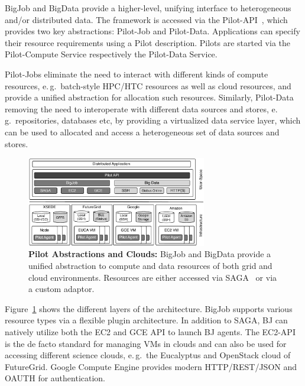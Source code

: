 \documentclass[times]{cpeauth}
\newcommand{\pilot}{Pilot\xspace}
\newcommand{\pilots}{Pilots\xspace}
\newcommand{\pilotjob}{Pilot-Job\xspace}
\newcommand{\pilotjobs}{Pilot-Jobs\xspace}
\newcommand{\pilotdata}{Pilot-Data\xspace}
\newcommand{\pilotdataservice}{Pilot-Data Service\xspace}
\newcommand{\pilotcomputeservice}{Pilot-Compute Service\xspace}
\begin{document}
BigJob and BigData provide a higher-level, unifying interface to heterogeneous
and/or distributed data. The framework is accessed via the
Pilot-API~\cite{pilot_api}, which provides two key abstractions: \pilotjob and
\pilotdata. Applications can specify their resource requirements using a
\pilot description. \pilots are started via the \pilotcomputeservice
respectively the \pilotdataservice.

\pilotjobs eliminate the need to interact with different kinds of compute 
resources, e.\,g.\ batch-style HPC/HTC resources as well as cloud resources, 
and provide a unified abstraction for allocation such resources. Similarly, 
\pilotdata removing the need to interoperate with different data sources and 
stores, e.\,g.\ repositories, databases etc, by providing a virtualized data 
service layer, which can be used to allocated and access a heterogeneous set 
of data sources and stores.

\begin{figure}[t]
	\centering
		\includegraphics[width=0.7\textwidth]{figures/cloud_pilot_job.pdf}
	\caption{\textbf{Pilot Abstractions and Clouds:} BigJob and BigData 
	provide a unified abstraction to compute and data resources of both grid 
	and cloud environments. Resources are either accessed via 
	SAGA~\cite{ogf-gfd-90,saga-bliss-pd} or via a custom adaptor.}
	\label{fig:figures_cloud_pilot_job}
\end{figure}

Figure~\ref{fig:figures_cloud_pilot_job} shows the different layers of the
architecture. BigJob supports various resource types via a flexible plugin
architecture. In addition to SAGA, BJ can natively utilize both the EC2 and
GCE API to launch BJ agents. The EC2-API~\cite{amazonec2api} is the de facto 
standard for managing VMs in clouds and can also be used for accessing 
different science clouds, e.\,g.\ the Eucalyptus and OpenStack cloud of 
FutureGrid. Google Compute Engine provides modern HTTP/REST/JSON and OAUTH for 
authentication. 
\end{document}
